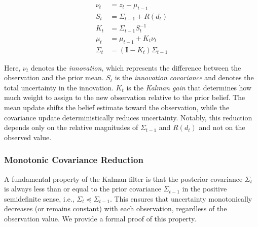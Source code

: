 \begin{align}
    \nu_t &= z_t - \mu_{t-1} \label{eq:innovation} \\
    S_t &= \Sigma_{t-1} + R(d_t) \label{eq:innovation_cov} \\
    K_t &= \Sigma_{t-1} S_t^{-1} \label{eq:kalman_gain} \\
    \mu_t &= \mu_{t-1} + K_t \nu_t \label{eq:mean_update} \\
    \Sigma_t &= (\mathbf{I} - K_t) \Sigma_{t-1} \label{eq:cov_update}
\end{align}

Here, $\nu_t$ denotes the \emph{innovation}, which represents the difference between the observation and the prior mean. $S_t$ is the \emph{innovation covariance} and denotes the total uncertainty in the innovation. $K_t$ is the \emph{Kalman gain} that determines how much weight to assign to the new observation relative to the prior belief. The mean update shifts the belief estimate toward the observation, while the covariance update deterministically reduces uncertainty. Notably, this reduction depends only on the relative magnitudes of $\Sigma_{t-1}$ and $R(d_t)$ and not on the observed value.

\subsubsection{Monotonic Covariance Reduction}

A fundamental property of the Kalman filter is that the posterior covariance $\Sigma_t$ is always less than or equal to the prior covariance $\Sigma_{t-1}$ in the positive semidefinite sense, i.e., $\Sigma_t \preceq \Sigma_{t-1}$. This ensures that uncertainty monotonically decreases (or remains constant) with each observation, regardless of the observation value. We provide a formal proof of this property.

